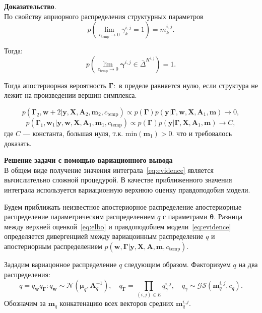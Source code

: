 \textbf{Доказательство}.\\
По свойству априорного распределения структурных параметров
$$p(\lim_{c_{\text{temp}} \to 0} {\gamma}^{i,j}_k  = 1) = {m}^{i,j}_k.$$

Тогда:
$$p(\lim_{c_{\text{temp}} \to 0} \boldsymbol{\gamma}^{i,j} \in \bar{\Delta}^{K^{i,j}}) = 1.$$

Тогда апостериорная вероятность $\boldsymbol{\Gamma}:$ в пределе равняется нулю, если структура не лежит на произведении вершин симплекса.

$$p(\boldsymbol{\Gamma}_2, \mathbf{w}+2|\mathbf{y}, \mathbf{X},\mathbf{A}_2,\mathbf{m}_2, {c_\text{temp}}) \propto p(\boldsymbol{\Gamma}) p(\mathbf{y} |\boldsymbol{\Gamma},   \mathbf{w}, \mathbf{X},\mathbf{A}_1,\mathbf{m}) \to 0,$$
$$p(\boldsymbol{\Gamma}_1,  \mathbf{w}_1|\mathbf{y}, \mathbf{w}, \mathbf{X},\mathbf{A}_1,\mathbf{m}_1, {c_\text{temp}}) \propto p(\boldsymbol{\Gamma}) p(\mathbf{y} |\boldsymbol{\Gamma},  \mathbf{X},\mathbf{A}_1,\mathbf{m}) \to C,$$
где $C$ --- константа, большая нуля, т.к. $ \text{min}(\mathbf{m}_1)>0$.
что и требовалось доказать.

\textbf{Решение задачи с помощью вариационного вывода}\\
В общем виде получение значения интеграла~\eqref{eq:evidence} является вычислительно сложной процедурой. В качестве приближенного значения интеграла используется вариационную верхнюю оценку правдоподобия модели. 

Будем приближать неизвестное апостериорное распределение апостериорные распределение параметрическим распределением $q$ с параметрами $\boldsymbol{\theta}$.
Разница между верхней оценкой~\eqref{eq:elbo} и правдоподобием модели~\eqref{eq:evidence} определяется дивергенцией между вариацоинным распределение $q$ и апостериорным распределением $p(\mathbf{w}, \boldsymbol{\Gamma}|\mathbf{y}, \mathbf{X}, \mathbf{A},\mathbf{m}, c_{\text{temp}})$. 

Зададим вариацонное распределение $q$ следующим образом. 
Факторизуем $q$ на два распределения: 
$$q = q_{\mathbf{w}}q_{\boldsymbol{\Gamma}}:
q_{\mathbf{w}} \sim \mathcal{N}(\boldsymbol{\mu}_q, \mathbf{A}^{-1}_q), \quad q_{\boldsymbol{\Gamma}} = \prod_{(i,j) \in E} q_\gamma^{i,j}, \quad q_\gamma \sim \mathcal{GS}( \mathbf{m}_q^{i,j}, c_q).$$
Обозначим за $\mathbf{m}_q$ конкатенацию всех векторов средних  $\mathbf{m}_q^{i,j}$.

